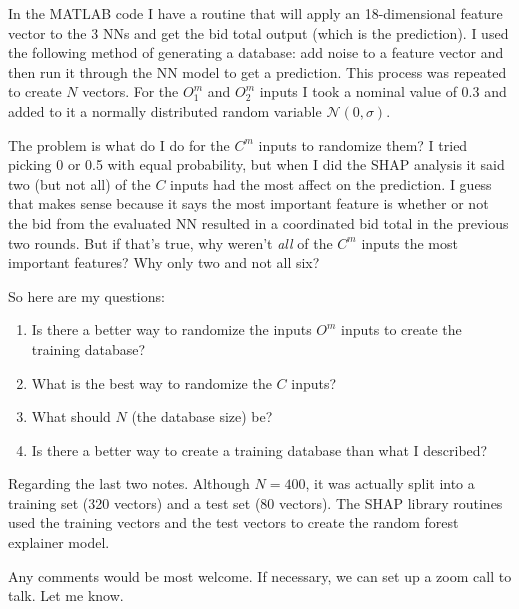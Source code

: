 \documentclass{article}   	%
\begin{document}
In the MATLAB code I have a routine that will apply an 18-dimensional feature vector to the 3 NNs and get the bid total output (which is the prediction). I used the following method of generating a database: add noise to a feature vector and then run it through the NN model to get a prediction.  This process was repeated to create $N$ vectors. For the $O_1^m$ and $O_2^m$ inputs I took a nominal value of 0.3 and added to it a normally distributed random variable $\mathcal{N}(0,\sigma)$. 

The problem is what do I do for the $C^m$ inputs to randomize them? 
I tried picking 0 or 0.5 with equal probability, but when I did the SHAP analysis it said two (but not all) of the $C$ inputs had the most affect on the prediction. I guess that makes sense because it says the most important feature is whether or not the bid from the evaluated NN resulted in a coordinated bid total in the previous two rounds. But if that's true, why weren't \textit{all} of the $C^m$ inputs the most important features? Why only two and not all six?

So here are my questions:
\begin{enumerate}
\item Is there a better way to randomize the inputs $O^m$ inputs to create the training database?
\item What is the best way to randomize the $C$ inputs?
\item What should $N$ (the database size) be? 
\item Is there a better way to create a training database than what I described?
\end{enumerate}

Regarding the last two notes. Although $N=400$, it was actually split into a training set (320 vectors) and a test set (80 vectors). The SHAP library routines used the training vectors and the test vectors to create the random forest explainer model.

  Any comments would be most welcome. If necessary, we can set up a zoom call to talk. Let me know.
\end{document}
